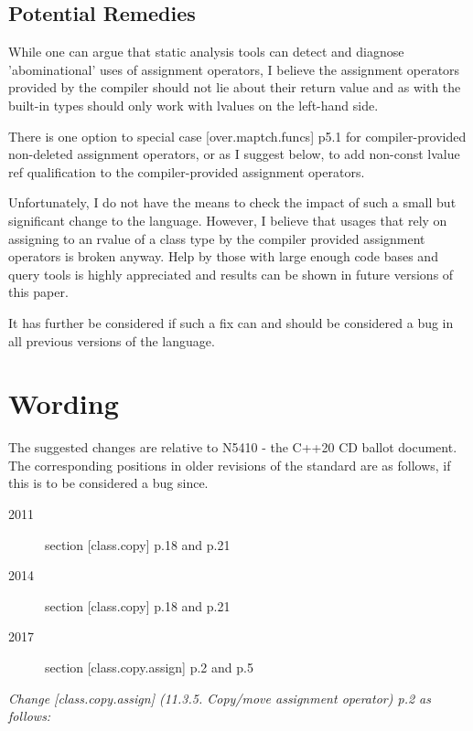 \documentclass[ebook,11pt,article]{memoir}
\begin{document}
\section{Potential Remedies}

While one can argue that static analysis tools can detect and diagnose 'abominational' uses of assignment operators, I believe the assignment operators provided by the compiler should not lie about their return value and as with the built-in types should only work with lvalues on the left-hand side.

There is one option to special case [over.maptch.funcs] p5.1 for compiler-provided non-deleted assignment operators, or as I suggest below, to add non-const lvalue ref qualification to the compiler-provided assignment operators.

Unfortunately, I do not have the means to check the impact of such a small but significant change to the language. 
However, I believe that usages that rely on assigning to an rvalue of a class type by the compiler provided assignment operators is broken anyway.
Help by those with large enough code bases and query tools is highly appreciated and results can be shown in future versions of this paper.

It has further be considered if such a fix can and should be considered a bug in all previous versions of the language.


\chapter{Wording}

The suggested changes are relative to N5410 - the C++20 CD ballot document. 
The corresponding positions in older revisions of the standard are as follows, if this is to be considered a bug since.
\begin{description}
\item[2011] section [class.copy] p.18 and p.21
\item[2014] section [class.copy] p.18 and p.21
\item[2017] section [class.copy.assign] p.2 and p.5
\end{description}

\pnum
\emph{Change [class.copy.assign] (11.3.5. Copy/move assignment operator) p.2 as follows:}
\end{document}
